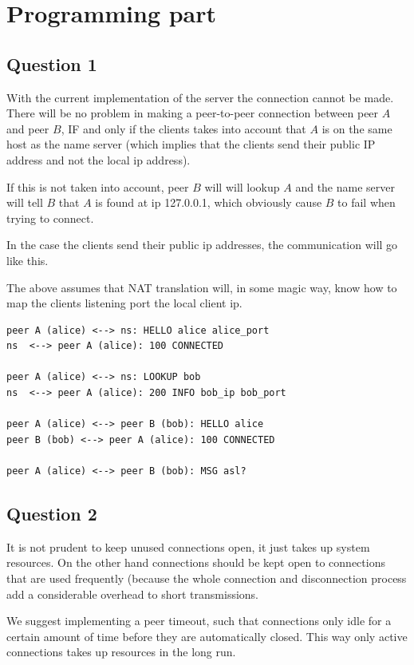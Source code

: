 \section{Programming part}
\subsection{Question 1}
With the current implementation of the server the connection cannot be made.
There will be no problem in making a peer-to-peer connection between peer $A$
and peer $B$, IF and only if the clients takes into account that $A$ is on the
same host as the name server (which implies that the clients send their public IP
address and not the local ip address).

If this is not taken into account, peer $B$ will will lookup $A$ and the name
server will tell $B$ that $A$ is found at ip 127.0.0.1, which obviously cause
$B$ to fail when trying to connect.

In the case the clients send their public ip addresses, the communication will
go like this.

The above assumes that NAT translation will, in some magic way, know how to
map the clients listening port the local client ip.

\begin{lstlisting}
peer A (alice) <--> ns: HELLO alice alice_port
ns  <--> peer A (alice): 100 CONNECTED

peer A (alice) <--> ns: LOOKUP bob
ns  <--> peer A (alice): 200 INFO bob_ip bob_port

peer A (alice) <--> peer B (bob): HELLO alice
peer B (bob) <--> peer A (alice): 100 CONNECTED

peer A (alice) <--> peer B (bob): MSG asl?
\end{lstlisting}

\subsection{Question 2}
It is not prudent to keep unused connections open, it just takes up system
resources. On the other hand connections should be kept open to connections
that are used frequently (because the whole connection and disconnection
process add a considerable overhead to short transmissions.

We suggest implementing a peer timeout, such that connections only idle for a
certain amount of time before they are automatically closed. This way only
active connections takes up resources in the long run.

